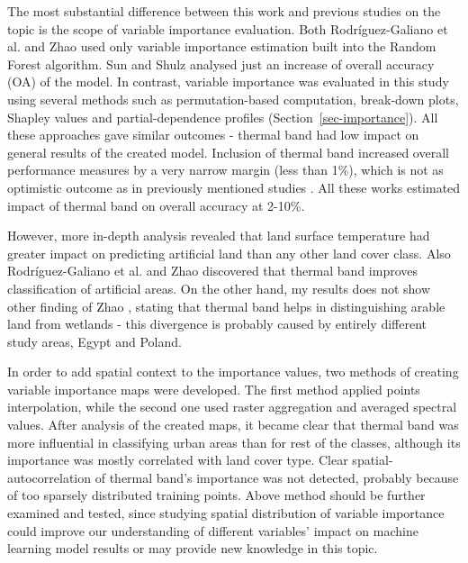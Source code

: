 \documentclass{amuthesis}
\begin{document}
The most substantial difference between this work and previous studies
on the topic is the scope of variable importance evaluation. Both
Rodríguez-Galiano et al.
\autocite*{rodriguez-galiano_incorporating_2012} and Zhao
\autocite*{zhao_exploring_2019} used only variable importance estimation
built into the Random Forest algorithm. Sun and Shulz
\autocite*{sun_improvement_2015} analysed just an increase of overall
accuracy (OA) of the model. In contrast, variable importance was
evaluated in this study using several methods such as permutation-based
computation, break-down plots, Shapley values and partial-dependence
profiles (Section~\ref{sec-importance}). All these approaches gave
similar outcomes - thermal band had low impact on general results of the
created model. Inclusion of thermal band increased overall performance
measures by a very narrow margin (less than 1\%), which is not as
optimistic outcome as in previously mentioned studies
\autocite{rodriguez-galiano_incorporating_2012,sun_improvement_2015,zhao_exploring_2019}.
All these works estimated impact of thermal band on overall accuracy at
2-10\%.

However, more in-depth analysis revealed that land surface temperature
had greater impact on predicting artificial land than any other land
cover class. Also Rodríguez-Galiano et al.
\autocite*{rodriguez-galiano_incorporating_2012} and Zhao
\autocite*{zhao_exploring_2019} discovered that thermal band improves
classification of artificial areas. On the other hand, my results does
not show other finding of Zhao \autocite*{zhao_exploring_2019}, stating
that thermal band helps in distinguishing arable land from wetlands -
this divergence is probably caused by entirely different study areas,
Egypt and Poland.

In order to add spatial context to the importance values, two methods of
creating variable importance maps were developed. The first method
applied points interpolation, while the second one used raster
aggregation and averaged spectral values. After analysis of the created
maps, it became clear that thermal band was more influential in
classifying urban areas than for rest of the classes, although its
importance was mostly correlated with land cover type. Clear
spatial-autocorrelation of thermal band's importance was not detected,
probably because of too sparsely distributed training points. Above
method should be further examined and tested, since studying spatial
distribution of variable importance could improve our understanding of
different variables' impact on machine learning model results or may
provide new knowledge in this topic.
\end{document}
